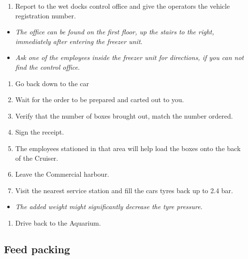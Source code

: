 \documentclass[
  12pt,
]{report}
\providecommand{\tightlist}{%
  \setlength{\itemsep}{0pt}\setlength{\parskip}{0pt}}\usepackage{longtable,booktabs,array}
\begin{document}
\begin{enumerate}
\def\labelenumi{\arabic{enumi}.}
\setcounter{enumi}{5}
\tightlist
\item
  Report to the wet docks control office and give the operators the
  vehicle registration number.
\end{enumerate}

\begin{itemize}
\tightlist
\item
  \emph{The office can be found on the first floor, up the stairs to the
  right, immediately after entering the freezer unit}.
\item
  \emph{Ask one of the employees inside the freezer unit for directions,
  if you can not find the control office}.
\end{itemize}

\begin{enumerate}
\def\labelenumi{\arabic{enumi}.}
\setcounter{enumi}{6}
\tightlist
\item
  Go back down to the car
\item
  Wait for the order to be prepared and carted out to you.
\item
  Verify that the number of boxes brought out, match the number ordered.
\item
  Sign the receipt.
\item
  The employees stationed in that area will help load the boxes onto the
  back of the Cruiser.
\item
  Leave the Commercial harbour.
\item
  Visit the nearest service station and fill the cars tyres back up to
  2.4 bar.
\end{enumerate}

\begin{itemize}
\tightlist
\item
  \emph{The added weight might significantly decrease the tyre
  pressure}.\\
\end{itemize}

\begin{enumerate}
\def\labelenumi{\arabic{enumi}.}
\setcounter{enumi}{13}
\tightlist
\item
  Drive back to the Aquarium.
\end{enumerate}

\hypertarget{feed-packing}{%
\subsection{Feed packing}\label{feed-packing}}
\end{document}
